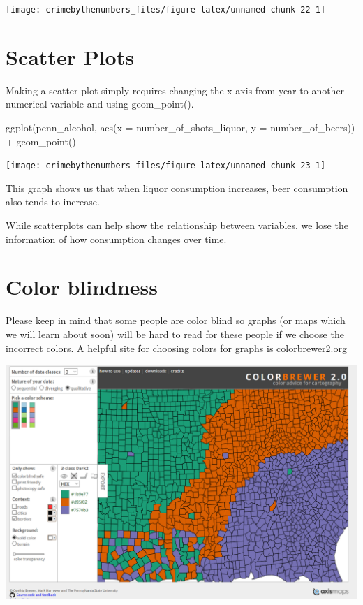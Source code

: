 \documentclass[
  12pt,
]{book}
\newenvironment{Shaded}{\begin{snugshade}}{\end{snugshade}}
\newcommand{\AttributeTok}[1]{\textcolor[rgb]{0.61,0.61,0.61}{#1}}
\newcommand{\FunctionTok}[1]{\textcolor[rgb]{0,0,0}{#1}}
\newcommand{\NormalTok}[1]{#1}
\newcommand{\SpecialCharTok}[1]{\textcolor[rgb]{0,0,0}{#1}}
\begin{document}
\begin{center}\texttt{[image: crimebythenumbers\_files/figure-latex/unnamed-chunk-22-1]} \end{center}

\hypertarget{scatter-plots}{%
\section{Scatter Plots}\label{scatter-plots}}

Making a scatter plot simply requires changing the x-axis from year to another numerical variable and using geom\_point().

\begin{Shaded}
\begin{Highlighting}[]
\FunctionTok{ggplot}\NormalTok{(penn\_alcohol, }\FunctionTok{aes}\NormalTok{(}\AttributeTok{x =}\NormalTok{ number\_of\_shots\_liquor,}
                         \AttributeTok{y =}\NormalTok{ number\_of\_beers)) }\SpecialCharTok{+}
  \FunctionTok{geom\_point}\NormalTok{()}
\end{Highlighting}
\end{Shaded}

\begin{center}\texttt{[image: crimebythenumbers\_files/figure-latex/unnamed-chunk-23-1]} \end{center}

This graph shows us that when liquor consumption increases, beer consumption also tends to increase.

While scatterplots can help show the relationship between variables, we lose the information of how consumption changes over time.

\hypertarget{color-blindness}{%
\section{Color blindness}\label{color-blindness}}

Please keep in mind that some people are color blind so graphs (or maps which we will learn about soon) will be hard to read for these people if we choose the incorrect colors. A helpful site for choosing colors for graphs is \href{http://colorbrewer2.org}{colorbrewer2.org}

\includegraphics{images/colorbrewer.PNG}
\end{document}
